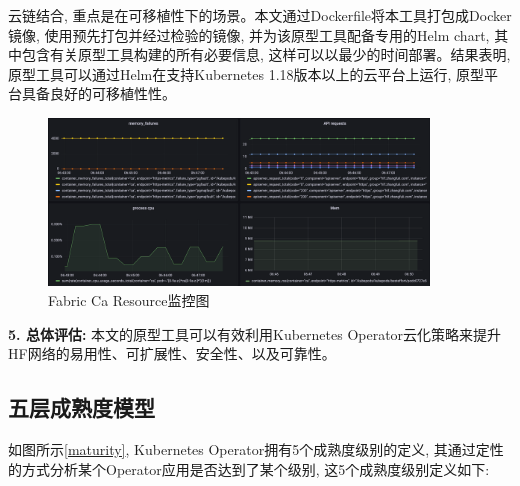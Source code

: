云链结合, 重点是在可移植性下的场景。本文通过Dockerfile将本工具打包成Docker镜像\footnotemark[1], 使用预先打包并经过检验的镜像, 并为该原型工具配备专用的Helm chart, 其中包含有关原型工具构建的所有必要信息, 这样可以以最少的时间部署。结果表明, 原型工具可以通过Helm在支持Kubernetes 1.18版本以上的云平台上运行, 原型平台具备良好的可移植性性。

\begin{figure}[h] %
    \centering %
    \includegraphics[width=0.9\textwidth]{FIGs/chapter5/monitoring.pdf} %
    \caption{Fabric Ca Resource监控图} %
    \label{monitoring} %
\end{figure}%

\textbf{5. 总体评估: }本文的原型工具可以有效利用Kubernetes Operator云化策略来提升HF网络的易用性、可扩展性、安全性、以及可靠性。


\subsection{五层成熟度模型}

如图所示\ref{maturity}, Kubernetes Operator拥有5个成熟度级别的定义\cite{duan2021case}, 其通过定性的方式分析某个Operator应用是否达到了某个级别, 这5个成熟度级别定义如下:

